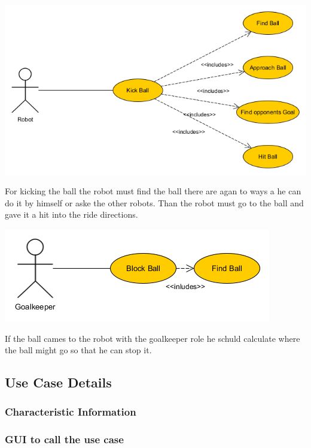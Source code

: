 \documentclass[12pt]{article}
\theoremstyle{definition}
\begin{document}
\begin{flushright}
\includegraphics[scale=.5]{Kick_the_Ball.png}\\
\end{flushright}
For kicking the ball the robot must find the ball there are agan to ways a he can do it by himself or aske the other robots. Than the robot must go to the ball and gave it a hit into the ride directions.

\begin{flushright}
\includegraphics[scale=.5]{BlockBall.png}\\
\end{flushright}
If the ball cames to the robot with the goalkeeper role he schuld calculate where the ball might go so that he can stop it.
\pagebreak
\subsection{Use Case Details}

\pagebreak
\subsubsection{Characteristic Information}

\pagebreak
\subsubsection{GUI to call the use case}
\end{document}
